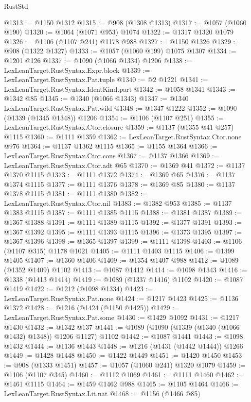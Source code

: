 \begin{lexlean}{RustStd}
\begin{coremodule}
@1313 := @1150 @1312
@1315 := @908 (@1308 @1313)
@1317 := @1057 (@1060 @190)
@1320 := @1064 (@1071 @953) @1074
@1322 := @1317 @1320 @1079
@1326 := @1106 (@1107 @241) @1178 @988
@1327 := @1150 @1326
@1329 := @908 (@1322 @1327)
@1333 := @1057 (@1060 @199) @1075 @1307
@1334 := @1201 @126
@1337 := @1090 (@1066 @1334) @1206
@1338 := LexLeanTarget.RustSyntax.Expr.block
@1339 := LexLeanTarget.RustSyntax.Pat.tuple
@1340 := @2 @1221
@1341 := LexLeanTarget.RustSyntax.IdentKind.part
@1342 := @1058 @1341
@1343 := @1342 @85
@1345 := @1340 (@1066 @1343)
@1347 := @1340 LexLeanTarget.RustSyntax.Pat.wild
@1348 := @1347 @1222
@1352 := @1090 (@1339 (@1345 @1348)) @1206
@1354 := @1106 (@1107 @251)
@1355 := LexLeanTarget.RustSyntax.Ctor.closure
@1359 := @1137 (@1355 @41 @257) @1115
@1360 := @1111 @1359
@1362 := LexLeanTarget.RustSyntax.Ctor.none @976
@1364 := @1137 @1362 @1115
@1365 := @1155 @1364
@1366 := LexLeanTarget.RustSyntax.Ctor.cons
@1367 := @1137 @1366
@1369 := LexLeanTarget.RustSyntax.Ctor.adt @65
@1370 := @1369 @41
@1372 := @1137 @1370 @1115
@1373 := @1111 @1372
@1374 := @1369 @65
@1376 := @1137 @1374 @1115
@1377 := @1111 @1376
@1378 := @1369 @85
@1380 := @1137 @1378 @1115
@1381 := @1111 @1380
@1382 := LexLeanTarget.RustSyntax.Ctor.nil
@1383 := @1382 @953
@1385 := @1137 @1383 @1115
@1387 := @1111 @1385 @1115
@1388 := @1381 @1387
@1389 := @1367 @1388
@1391 := @1111 @1389 @1115
@1392 := @1377 @1391
@1393 := @1367 @1392
@1395 := @1111 @1393 @1115
@1396 := @1373 @1395
@1397 := @1367 @1396
@1398 := @1365 @1397
@1399 := @1111 @1398
@1403 := @1106 (@1107 @315) @1178 @1021
@1405 := @1111 @1403 @1115
@1406 := @1399 @1405
@1407 := @1360 @1406
@1409 := @1354 @1407 @988
@1412 := @1089 (@1352 @1409) @1102
@1413 := @1087 @1412
@1414 := @1098 @1343
@1416 := @1338 (@1413 @1414)
@1419 := @1089 (@1337 @1416) @1102
@1420 := @1087 @1419
@1422 := @1212 (@1098 @1334)
@1423 := LexLeanTarget.RustSyntax.Pat.none
@1424 := @1217 @1423
@1425 := @1136 @1372
@1428 := @1216 (@1424 (@1150 @1425))
@1429 := LexLeanTarget.RustSyntax.Pat.some
@1430 := @1429 @1092
@1431 := @1217 @1430
@1432 := @1342 @137
@1441 := @1089 (@1090 (@1339 (@1340 (@1066 @1432) @1348)) @1206 @1127) @1102
@1442 := @1087 @1441
@1443 := @1098 @1432
@1444 := @1136 @1443
@1448 := @1216 (@1431 (@1442 @1444)) @1266
@1449 := @1428 @1448
@1450 := @1422 @1449
@1451 := @1420 @1450
@1453 := @908 (@1333 @1451)
@1457 := @1057 (@1060 @241) @1320 @1079
@1459 := @1106 (@1107 @345)
@1460 := @1112 @1069
@1461 := @1111 @1460
@1462 := @1461 @1115
@1464 := @1459 @1462 @988
@1465 := @1105 @1464
@1466 := LexLeanTarget.RustSyntax.Lit.nat
@1468 := @1156 (@1466 @85)

\end{coremodule}
\end{lexlean}
